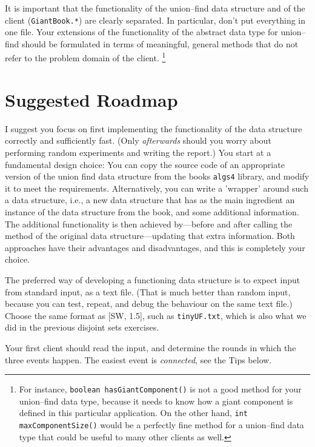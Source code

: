 \documentclass{tufte-handout}
\begin{document}
It is important that the functionality of the union--find data
structure and of the client ({\tt GiantBook.*}) are clearly
separated.
In particular, don't put everything in one file.
Your extensions of the functionality of the abstract data type for union--find should be formulated in terms of meaningful, general methods that do not refer to the problem domain of the client. 
\footnote{For instance, {\tt boolean hasGiantComponent()} is not a good method for your union--find data type, because it needs to know how a giant component is defined in this particular application. On the other hand, {\tt int maxComponentSize()} would be a perfectly fine method for a union--find data type that could be useful to many other clients as well.}

\section{Suggested Roadmap}

I suggest you focus on first implementing the functionality of the data structure correctly and sufficiently fast.
(Only \emph{afterwards} should you worry about performing random experiments and writing the report.)
You start at a fundamental design choice: You can copy the source code of an appropriate version of the union find data structure from the books \texttt{algs4} library, and modify it to meet the requirements. 
Alternatively, you can write a 'wrapper' around such a data structure, i.e., a new data structure that has as the main ingredient an instance of the data structure from the book, and some additional information. 
The additional functionality is then achieved by---before and after calling the method of the original data structure---updating that extra information.
Both approaches have their advantages and disadvantages, and this is completely your choice.

The preferred way of developing a functioning data structure is to expect input from standard input, as a text file.
(That is much better than random input, because you can test, repeat, and debug the behaviour on the same text file.)
Choose the same format as [SW, 1.5], such as \texttt{tinyUF.txt}, which is also what we did in the previous disjoint sets exercises.

Your first client should read the input, and determine the rounds in which the three events happen.
The easiest event is \emph{connected}, see the Tips below.
\end{document}
